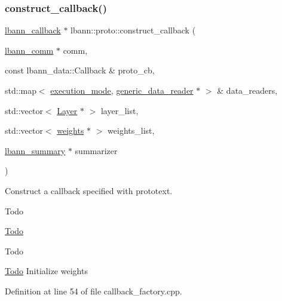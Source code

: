 \subsubsection{\texorpdfstring{construct\+\_\+callback()}{construct\_callback()}}
{\footnotesize\ttfamily \hyperlink{classlbann_1_1lbann__callback}{lbann\+\_\+callback} $\ast$ lbann\+::proto\+::construct\+\_\+callback (\begin{DoxyParamCaption}\item[{\hyperlink{classlbann_1_1lbann__comm}{lbann\+\_\+comm} $\ast$}]{comm,  }\item[{const lbann\+\_\+data\+::\+Callback \&}]{proto\+\_\+cb,  }\item[{std\+::map$<$ \hyperlink{base_8hpp_a2781a159088df64ed7d47cc91c4dc0a8}{execution\+\_\+mode}, \hyperlink{classlbann_1_1generic__data__reader}{generic\+\_\+data\+\_\+reader} $\ast$ $>$ \&}]{data\+\_\+readers,  }\item[{std\+::vector$<$ \hyperlink{classlbann_1_1Layer}{Layer} $\ast$ $>$}]{layer\+\_\+list,  }\item[{std\+::vector$<$ \hyperlink{classlbann_1_1weights}{weights} $\ast$ $>$}]{weights\+\_\+list,  }\item[{\hyperlink{classlbann_1_1lbann__summary}{lbann\+\_\+summary} $\ast$}]{summarizer }\end{DoxyParamCaption})}

Construct a callback specified with prototext. \begin{DoxyRefDesc}{Todo}
\item[\hyperlink{todo__todo000004}{Todo}]\end{DoxyRefDesc}


\begin{DoxyRefDesc}{Todo}
\item[\hyperlink{todo__todo000005}{Todo}]Initialize weights \end{DoxyRefDesc}


Definition at line 54 of file callback\+\_\+factory.\+cpp.


